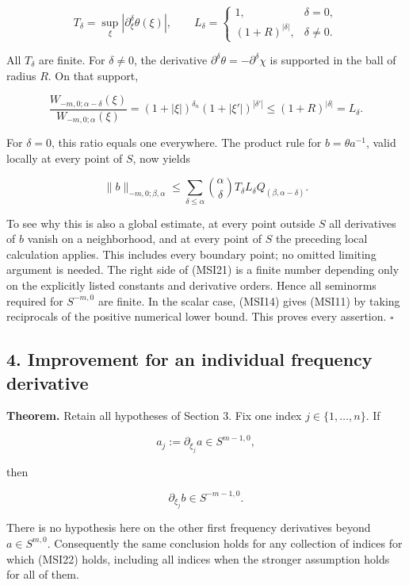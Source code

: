 \documentclass[
  11pt,
]{article}
\begin{document}
\[
T_\delta=\sup_\xi|\partial_\xi^\delta\theta(\xi)|,
\qquad
L_\delta=
\begin{cases}1,&\delta=0,\\(1+R)^{|\delta|},&\delta\ne0.
\end{cases}
\tag{MSI19}
\]

All \(T_\delta\) are finite. For \(\delta\ne0\), the derivative
\(\partial^\delta\theta=-\partial^\delta\chi\) is supported in the ball
of radius \(R\). On that support,

\[
\frac{W_{-m,0;\alpha-\delta}(\xi)}
     {W_{-m,0;\alpha}(\xi)}
=(1+|\xi|)^{\delta_n}(1+|\xi'|)^{|\delta'|}
\leq (1+R)^{|\delta|}=L_\delta.
\tag{MSI20}
\]

For \(\delta=0\), this ratio equals one everywhere. The product rule for
\(b=\theta a^{-1}\), valid locally at every point of \(S\), now yields

\[
\|b\|_{-m,0;\beta,\alpha}
\leq
\sum_{\delta\leq\alpha}
 \binom\alpha\delta T_\delta L_\delta
 Q_{(\beta,\alpha-\delta)}.
\tag{MSI21}
\]

To see why this is also a global estimate, at every point outside \(S\)
all derivatives of \(b\) vanish on a neighborhood, and at every point of
\(S\) the preceding local calculation applies. This includes every
boundary point; no omitted limiting argument is needed. The right side
of (MSI21) is a finite number depending only on the explicitly listed
constants and derivative orders. Hence all seminorms required for
\(S^{-m,0}\) are finite. In the scalar case, (MSI14) gives (MSI11) by
taking reciprocals of the positive numerical lower bound. This proves
every assertion. \(\square\)

\subsection{4. Improvement for an individual frequency
derivative}\label{improvement-for-an-individual-frequency-derivative}

\textbf{Theorem.} Retain all hypotheses of Section 3. Fix one index
\(j\in\{1,\ldots,n\}\). If

\[
a_j:=\partial_{\xi_j}a\in S^{m-1,0},
\tag{MSI22}
\]

then

\[
\partial_{\xi_j}b\in S^{-m-1,0}.
\tag{MSI23}
\]

There is no hypothesis here on the other first frequency derivatives
beyond \(a\in S^{m,0}\). Consequently the same conclusion holds for any
collection of indices for which (MSI22) holds, including all indices
when the stronger assumption holds for all of them.
\end{document}
